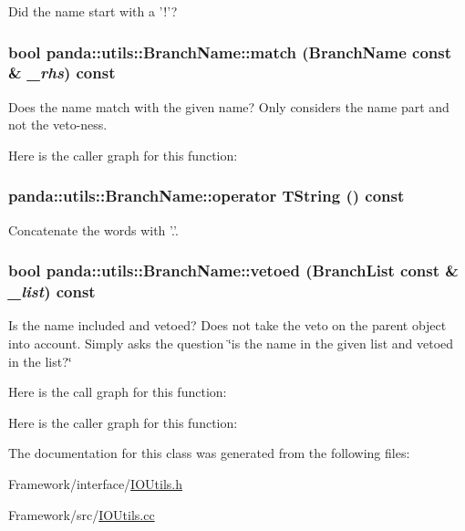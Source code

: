 Did the name start with a '!'? \hypertarget{classpanda_1_1utils_1_1BranchName_ae67f0ec0a51cd28fe78c8e539aa9f95e}{
\subsubsection[{match}]{\setlength{\rightskip}{0pt plus 5cm}bool panda::utils::BranchName::match ({\bf BranchName} const \& {\em \_\-rhs}) const}}
\label{classpanda_1_1utils_1_1BranchName_ae67f0ec0a51cd28fe78c8e539aa9f95e}


Does the name match with the given name? Only considers the name part and not the veto-\/ness. 

Here is the caller graph for this function:\hypertarget{classpanda_1_1utils_1_1BranchName_a0de7e4b015a2ab797d121b12ba4b30bc}{
\subsubsection[{operator TString}]{\setlength{\rightskip}{0pt plus 5cm}panda::utils::BranchName::operator TString () const}}
\label{classpanda_1_1utils_1_1BranchName_a0de7e4b015a2ab797d121b12ba4b30bc}


Concatenate the words with '.'. \hypertarget{classpanda_1_1utils_1_1BranchName_ae3332329bf2afae5ed8e7c35e5d77ffa}{
\subsubsection[{vetoed}]{\setlength{\rightskip}{0pt plus 5cm}bool panda::utils::BranchName::vetoed ({\bf BranchList} const \& {\em \_\-list}) const}}
\label{classpanda_1_1utils_1_1BranchName_ae3332329bf2afae5ed8e7c35e5d77ffa}


Is the name included and vetoed? Does not take the veto on the parent object into account. Simply asks the question \char`\"{}is the name in the given list and vetoed in the list?\char`\"{} 

Here is the call graph for this function:

Here is the caller graph for this function:

The documentation for this class was generated from the following files:\begin{DoxyCompactItemize}
\item 
Framework/interface/\hyperlink{IOUtils_8h}{IOUtils.h}\item 
Framework/src/\hyperlink{IOUtils_8cc}{IOUtils.cc}\end{DoxyCompactItemize}
